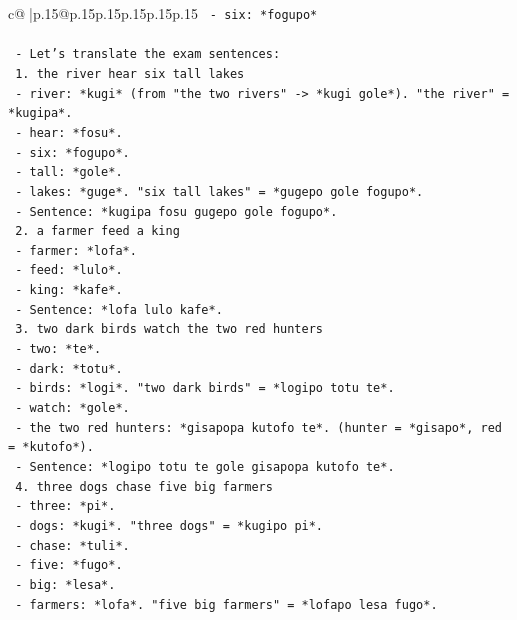 \documentclass{article}
\begin{document}
{\begin{supertabular}{c@{$\;$}|p{.15\linewidth}@{}p{.15\linewidth}p{.15\linewidth}p{.15\linewidth}p{.15\linewidth}p{.15\linewidth}}
{{{\texttt{      {-} six: *fogupo*} \\
\\ 
\texttt{    {-} Let's translate the exam sentences:} \\
\texttt{      1. the river hear six tall lakes} \\
\texttt{         {-} river: *kugi* (from "the two rivers" {-}> *kugi gole*). "the river" = *kugipa*.} \\
\texttt{         {-} hear: *fosu*.} \\
\texttt{         {-} six: *fogupo*.} \\
\texttt{         {-} tall: *gole*.} \\
\texttt{         {-} lakes: *guge*. "six tall lakes" = *gugepo gole fogupo*.} \\
\texttt{         {-} Sentence: *kugipa fosu gugepo gole fogupo*.} \\
\texttt{      2. a farmer feed a king} \\
\texttt{         {-} farmer: *lofa*.} \\
\texttt{         {-} feed: *lulo*.} \\
\texttt{         {-} king: *kafe*.} \\
\texttt{         {-} Sentence: *lofa lulo kafe*.} \\
\texttt{      3. two dark birds watch the two red hunters} \\
\texttt{         {-} two: *te*.} \\
\texttt{         {-} dark: *totu*.} \\
\texttt{         {-} birds: *logi*. "two dark birds" = *logipo totu te*.} \\
\texttt{         {-} watch: *gole*.} \\
\texttt{         {-} the two red hunters: *gisapopa kutofo te*. (hunter = *gisapo*, red = *kutofo*).} \\
\texttt{         {-} Sentence: *logipo totu te gole gisapopa kutofo te*.} \\
\texttt{      4. three dogs chase five big farmers} \\
\texttt{         {-} three: *pi*.} \\
\texttt{         {-} dogs: *kugi*. "three dogs" = *kugipo pi*.} \\
\texttt{         {-} chase: *tuli*.} \\
\texttt{         {-} five: *fugo*.} \\
\texttt{         {-} big: *lesa*.} \\
\texttt{         {-} farmers: *lofa*. "five big farmers" = *lofapo lesa fugo*.} \\
}}}
\end{supertabular}}
\end{document}
